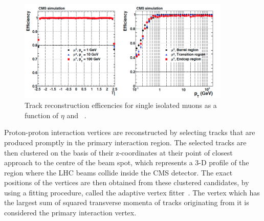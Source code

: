\begin{figure}
\begin{center}
\includegraphics[width=0.9\textwidth,keepaspectratio]{plots_and_figures/chapter4/trackrecon.png}
\caption{Track reconstruction efficencies for single isolated muons as a function of $\eta$ and \pt~\cite{track_reconstruction}.}
\label{fig:trackrecon}
\end{center}
\end{figure}


Proton-proton interaction vertices are reconstructed by selecting tracks that are produced promptly in the primary interaction region. The selected tracks are then clustered on the basis of their z-coordinates at their point of closest approach to the centre of the beam spot, which represents a 3-D profile of the region where the LHC beams collide inside the CMS detector. The exact positions of the vertices are then obtained from these clustered candidates, by using a fitting procedure, called the adaptive vertex fitter~\cite{vertex_fitting}. The vertex which has the largest sum of squared transverse momenta of tracks originating from it is considered the primary interaction vertex. 



